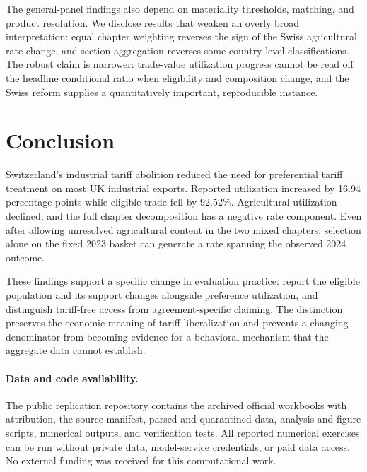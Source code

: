 \documentclass[11pt,a4paper]{article}
\begin{document}
The general-panel findings also depend on materiality thresholds, matching, and product resolution. We disclose results that weaken an overly broad interpretation: equal chapter weighting reverses the sign of the Swiss agricultural rate change, and section aggregation reverses some country-level classifications. The robust claim is narrower: trade-value utilization progress cannot be read off the headline conditional ratio when eligibility and composition change, and the Swiss reform supplies a quantitatively important, reproducible instance.

\section{Conclusion}
Switzerland's industrial tariff abolition reduced the need for preferential tariff treatment on most UK industrial exports. Reported utilization increased by 16.94 percentage points while eligible trade fell by 92.52\%. Agricultural utilization declined, and the full chapter decomposition has a negative rate component. Even after allowing unresolved agricultural content in the two mixed chapters, selection alone on the fixed 2023 basket can generate a rate spanning the observed 2024 outcome.

These findings support a specific change in evaluation practice: report the eligible population and its support changes alongside preference utilization, and distinguish tariff-free access from agreement-specific claiming. The distinction preserves the economic meaning of tariff liberalization and prevents a changing denominator from becoming evidence for a behavioral mechanism that the aggregate data cannot establish.

\paragraph{Data and code availability.}
The public replication repository contains the archived official workbooks with attribution, the source manifest, parsed and quarantined data, analysis and figure scripts, numerical outputs, and verification tests. All reported numerical exercises can be run without private data, model-service credentials, or paid data access. No external funding was received for this computational work.
\end{document}
